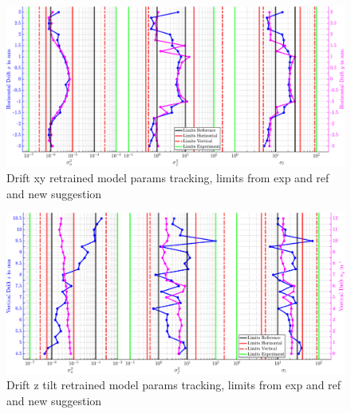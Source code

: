 \clearpage
\begin{landscape}
\begin{figure}[tbph]
	\centering
	\includegraphics[width=\linewidth]{chapters/images/4-EuOExp/Drift-Horizontal-Model-Parms}
	\caption[Drift xyz tilt retrained model params tracking]{Drift xy retrained model params tracking, limits from exp and ref and new suggestion}
	\label{fig:drift-horizontal-model-parms}
\end{figure}
\end{landscape}

\clearpage
\begin{landscape}
	\begin{figure}[tbph]
		\centering
		\includegraphics[width=\linewidth]{chapters/images/4-EuOExp/Drift-Vertical-Model-Parms}
		\caption[Drift xyz tilt retrained model params tracking]{Drift z tilt retrained model params tracking, limits from exp and ref and new suggestion}
		\label{fig:drift-vertical-model-parms}
	\end{figure}
\end{landscape}

